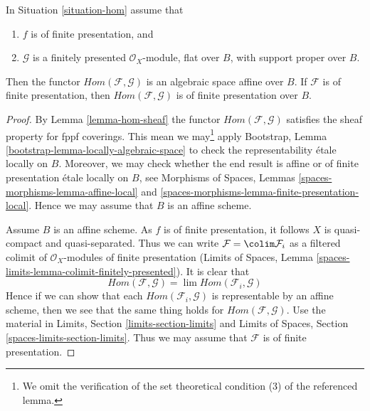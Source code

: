 \begin{proposition}
\label{proposition-hom}
In Situation \ref{situation-hom} assume that
\begin{enumerate}
\item $f$ is of finite presentation, and
\item $\mathcal{G}$ is a finitely presented $\mathcal{O}_X$-module,
flat over $B$, with support proper over $B$.
\end{enumerate}
Then the functor $\mathit{Hom}(\mathcal{F}, \mathcal{G})$ is
an algebraic space affine over $B$. If $\mathcal{F}$
is of finite presentation, then $\mathit{Hom}(\mathcal{F}, \mathcal{G})$
is of finite presentation over $B$.
\end{proposition}

\begin{proof}
By Lemma \ref{lemma-hom-sheaf} the functor
$\mathit{Hom}(\mathcal{F}, \mathcal{G})$ satisfies
the sheaf property for fppf coverings. This mean we may\footnote{We omit
the verification of the set theoretical condition (3) of the referenced
lemma.} apply
Bootstrap, Lemma \ref{bootstrap-lemma-locally-algebraic-space}
to check the representability \'etale locally on $B$. Moreover,
we may check whether the end result is affine or
of finite presentation \'etale locally on $B$, see
Morphisms of Spaces, Lemmas \ref{spaces-morphisms-lemma-affine-local} and
\ref{spaces-morphisms-lemma-finite-presentation-local}.
Hence we may assume that $B$ is an affine scheme.

\medskip\noindent
Assume $B$ is an affine scheme. As $f$ is of finite presentation, it follows
$X$ is quasi-compact and quasi-separated. Thus we can write
$\mathcal{F} = \colim \mathcal{F}_i$ as a filtered colimit of
$\mathcal{O}_X$-modules of finite presentation
(Limits of Spaces, Lemma \ref{spaces-limits-lemma-colimit-finitely-presented}).
It is clear that
$$
\mathit{Hom}(\mathcal{F}, \mathcal{G}) =
\lim \mathit{Hom}(\mathcal{F}_i, \mathcal{G})
$$
Hence if we can show that each $\mathit{Hom}(\mathcal{F}_i, \mathcal{G})$
is representable by an affine scheme, then we see that the same thing
holds for $\mathit{Hom}(\mathcal{F}, \mathcal{G})$. Use the material in
Limits, Section \ref{limits-section-limits} and
Limits of Spaces, Section \ref{spaces-limits-section-limits}.
Thus we may assume that $\mathcal{F}$ is of finite presentation.


\end{proof}
